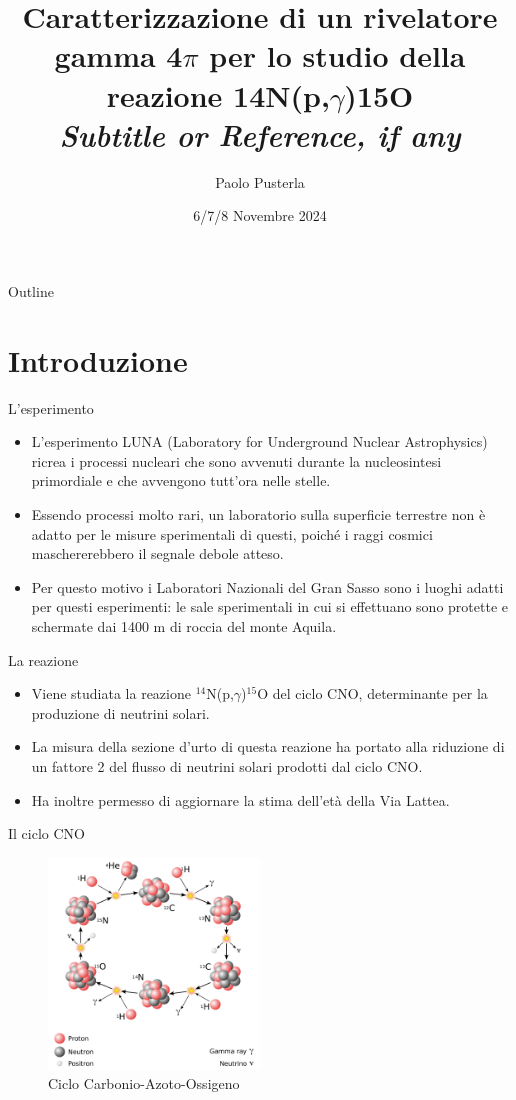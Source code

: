 \documentclass [xcolor=svgnames] {beamer}
\title[Short Title]{Caratterizzazione di un rivelatore gamma 4$\pi$ per lo studio della reazione 14N(p,$\gamma$)15O \\ \textit{Subtitle or Reference, if any}}
\author[P. Pusterla]{Paolo Pusterla}
\institute[UniTo]{Università degli Studi di Torino}
\date{6/7/8 Novembre 2024}
\begin{document}
	
	\begin{frame}
		\titlepage
	\end{frame}
	
	\begin{frame}{Outline}
		\tableofcontents
	\end{frame}
	
	\section{Introduzione}
	\begin{frame}{L'esperimento}
		\begin{itemize}
			\item L'esperimento LUNA (Laboratory for Underground Nuclear Astrophysics) ricrea i processi nucleari che sono avvenuti durante la nucleosintesi primordiale e che avvengono tutt'ora nelle stelle.
			\item Essendo processi molto rari, un laboratorio sulla superficie terrestre non è adatto per le misure sperimentali di questi, poiché i raggi cosmici maschererebbero il segnale debole atteso.
			\item Per questo motivo i Laboratori Nazionali del Gran Sasso sono i luoghi adatti per questi esperimenti: le sale sperimentali in cui si effettuano sono protette e schermate dai 1400 m di roccia del monte Aquila. 
		\end{itemize}
	\end{frame}
	
	\begin{frame}{La reazione}
		\begin{itemize}
			\item Viene studiata la reazione $^{14}$N(p,$\gamma$)$^{15}$O del ciclo CNO, determinante per la produzione di neutrini solari.
			\item La misura della sezione d'urto di questa reazione ha portato alla riduzione di un fattore 2 del flusso di neutrini solari prodotti dal ciclo CNO.
			\item Ha inoltre permesso di aggiornare la stima dell'età della Via Lattea.
		\end{itemize}
	\end{frame}

	\begin{frame}{Il ciclo CNO}
		\begin{figure}[H]
			\includegraphics[width=0.5\textwidth]{img/CNO_Cycle.pdf}
			\caption{Ciclo Carbonio-Azoto-Ossigeno}
		\end{figure}
	\end{frame}
\end{document}
